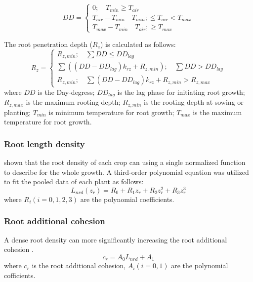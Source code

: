 \begin{equation}DD = \left \{\begin{array}{c}0; \quad T_{min} \ge T_{air} \\
T_{air}-T_{min}\quad T_{min}; \le T_{air} < T_{max} \\
T_{max}-T_{min}\quad T_{air}; \ge T_{max}\end{array} \right.\end{equation}

The root penetration depth ($R_z$) is calculated as follows:
\begin{equation}R_z = \left \{\begin{array}{c}R_{z,min}; \quad \sum DD \le DD_{lag} \\
\sum ((DD-DD_{lag})k_{rz}+R_{z,min});\quad \sum DD>DD_{lag} \\
R_{z,min};\quad \sum(DD-DD_{lag})k_{rz}+R_{z,min}>R_{z,max}\end{array} \right.\end{equation}
where $DD$ is the Day-degress; $DD_{lag}$ is the lag phase for initiating root growth;
$R_{z,max}$ is the maximum rooting depth; $R_{z,min}$ is the rooting depth at sowing or planting; $T_{min}$ is minimum temperature for root growth; $T_{max}$ is the maximum temperature for root growth.


\subsubsection{Root length density}
\cite{WuMod} shown that the root density of each crop can using a single normalized function to describe for the whole growth. A third-order polynomial equation was utilized to fit the pooled data of each plant as follows:
\begin{equation}L_{nrd}(z_r) = R_0 + R_1z_r+R_2z_r^2+R_3z_r^3\end{equation}
where $R_i (i=0,1,2,3) $ are the polynomial coefficients.

\subsubsection{Root additional cohesion}
A dense root density can more significantly increasing the root additional cohesion \citep{OsmanParameters, Zhang2015Effects}. 
\begin{equation}c_r=A_0 L_{nrd}+A_1\end{equation}
where $c_r$ is the root additional cohesion, $A_i(i=0,1)$ are the polynomial cofficients.

